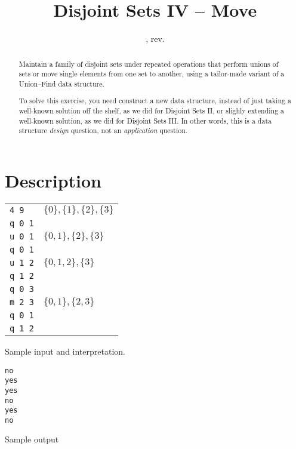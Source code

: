 \documentclass{tufte-handout}
\title{Disjoint Sets IV -- Move}
\author{}
\date{\GITAuthorDate, rev. \GITAbrHash}
\begin{document}
\maketitle

\begin{abstract}
  Maintain a family of disjoint sets under repeated operations that perform  unions of sets or move single elements from one set to another, using a tailor-made variant of a Union--Find data structure.

  To solve this exercise, you need construct a new data structure, instead of just taking a well-known solution off the shelf, as we did for Disjoint Sets II, or slighly extending a well-known solution, as we did for Disjoint Sets III.
  In other words, this is a data structure \emph{design} question, not an \emph{application} question.
\end{abstract}

\section{Description}
\begin{marginfigure}
  \begin{tabular}{ll}
    \texttt{4 9}   & $\{0\}, \{1\}, \{2\},\{3\}$\\
    \texttt{q 0 1} \\
    \texttt{u 0 1} & $\{0, 1\}, \{2\},\{3\}$ \\
    \texttt{q 0 1} &\\
    \texttt{u 1 2} & $\{0, 1, 2\},\{3\}$ \\
    \texttt{q 1 2} &\\
    \texttt{q 0 3} &\\
    \texttt{m 2 3}   & $\{0, 1\}, \{2,3\}$ \\
    \texttt{q 0 1} &\\
    \texttt{q 1 2} &
  \end{tabular}
  \caption{Sample input and interpretation.}
\end{marginfigure}

\begin{marginfigure}
  \begin{verbatim}
no
yes
yes
no
yes
no
  \end{verbatim}
  \caption{Sample output}
\end{marginfigure}
\end{document}
